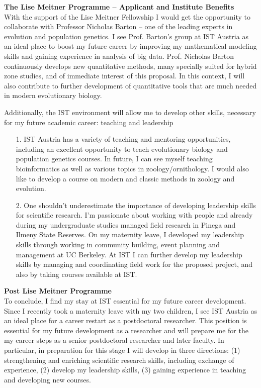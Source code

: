 \documentclass[11pt,a4paper]{article}
\begin{document}
{\bf \large The Lise Meitner Programme – Applicant and Institute Benefits}\\
With the support of the Lise Meitner Fellowship I would get the opportunity to collaborate with Professor Nicholas Barton – one of the leading experts in evolution and population genetics. I see Prof. Barton’s group at IST Austria as an ideal place to boost my future career by improving my mathematical modeling skills and gaining experience in analysis of big data. Prof. Nicholas Barton continuously develops new quantitative methods, many specially suited for hybrid zone studies, and of immediate interest of this proposal. In this context, I will also contribute to further development of quantitative tools that are much needed in modern evolutionary biology. 

Additionally, the IST environment will allow me to develop other skills, necessary for my future academic career: teaching and leadership
\begin{itemize}
\item[1.]IST Austria has a variety of teaching and mentoring opportunities, including an excellent opportunity to teach evolutionary biology and population genetics courses. In future, I can see myself teaching bioinformatics as well as various topics in zoology/ornithology. I would also like to develop a course on modern and classic methods in zoology and evolution.  
\item[2.] One shouldn’t underestimate the importance of developing leadership skills for scientific research. I’m passionate about working with people and already during my undergraduate studies managed field research in Pinega and Ilmeny State Reserves. On my maternity leave, I developed my leadership skills through working in community building, event planning and management at UC Berkeley. At IST I can further develop my leadership skills by managing and coordinating field work for the proposed project, and also by taking courses available at IST. 
\end{itemize}

{\bf \large Post Lise Meitner Programme}\\
To conclude, I find my stay at IST essential for my future career development. Since I recently took a maternity leave with my two children, I see IST Austria as an ideal place for a career restart as a postdoctoral researcher. This position is essential for my future development as a researcher and will prepare me for the my career steps as a senior postdoctoral researcher and later faculty. In particular, in preparation for this stage I will develop in three directions: (1) strengthening and enriching scientific research skills, including exchange of experience, (2) develop my leadership skills, (3) gaining experience in teaching and developing new courses. 
\end{document}
